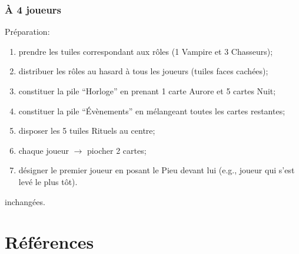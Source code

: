 \documentclass[11pt]{beamer}
\begin{document}
\begin{frame}
	\frametitle{À 4 joueurs}
	
	Préparation:
	\begin{enumerate}
		\item prendre les tuiles correspondant aux rôles (1 Vampire et 3 Chasseurs);
		\item distribuer les rôles au hasard à tous les joueurs (tuiles faces cachées);
		\item constituer la pile \enquote{Horloge} en prenant 1 carte Aurore et 5 cartes Nuit;
		\item constituer la pile \enquote{Évènements} en mélangeant toutes les cartes restantes;
		\item disposer les 5 tuiles Rituels au centre;
		\item chaque joueur $\rightarrow$ piocher 2 cartes;
		\item désigner le premier joueur en posant le Pieu devant lui (e.g., joueur qui s'est levé le plus tôt).
	\end{enumerate}

	\vspace*{1ex}

	\hyperlink{frame:end}{} inchangées.
\end{frame}



\section{Références}

%	
%
\end{document}
